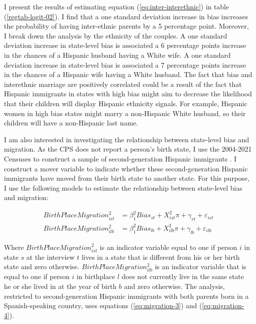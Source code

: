 \documentclass[12pt,english]{article}
\begin{document}
I present the results of estimating equation (\ref{eq:inter-interethnic}) in table (\ref{regtab-logit-02}). I find that a one standard deviation increase in bias increases the probability of having inter-ethnic parents by a 5 percentage point. Moreover, I break down the analysis by the ethnicity of the couples. A one standard deviation increase in state-level bias is associated a 6 percentage points increase in the chances of a Hispanic husband having a White wife. A one standard deviation increase in state-level bias is associated a 7 percentage points increase in the chances of a Hispanic wife having a White husband. The fact that bias and interethnic marriage are positively correlated could be a result of the fact that Hispanic immigrants in states with high bias might aim to decrease the likelihood that their children will display Hispanic ethnicity signals. For example, Hispanic women in high bias states might marry a non-Hispanic White husband, so their children will have a non-Hispanic last name.

I am also interested in investigating the relationship between state-level bias and migration. As the CPS does not report a person's birth state, I use the 2004-2021 Censuses to construct a sample of second-generation Hispanic immigrants \autocite{floodsarahIntegratedPublicUse2021}. I construct a mover variable to indicate whether these second-generation Hispanic immigrants have moved from their birth state to another state. For this purpose, I use the following models to estimate the relationship between state-level bias and migration:

\begin{align}
BirthPlaceMigration_{ist}^2 &= \beta_1^2 Bias_{st} 
                   + X_{ist}^2\pi + \gamma_{rt} 
                   + \varepsilon_{ist} \label{eq:migration-3} \\
BirthPlaceMigration_{ilb}^2 &= \beta_1^2 Bias_{lb} 
                   + X_{ilb}^2\pi + \gamma_{lb} 
                   + \varepsilon_{ilb} \label{eq:migration-4}
\end{align}

Where $BirthPlaceMigration_{ist}^2$ is an indicator variable equal to one if person $i$ in state $s$ at the interview $t$ lives in a state that is different from his or her birth state and zero otherwise. $BirthPlaceMigration_{ilb}^2$ is an indicator variable that is equal to one if person $i$ in birthplace $l$ does not currently live in the same state he or she lived in at the year of birth $b$ and zero otherwise. The analysis, restricted to second-generation Hispanic immigrants with both parents born in a Spanish-speaking country, uses equations (\ref{eq:migration-3}) and (\ref{eq:migration-4}). 
\end{document}
